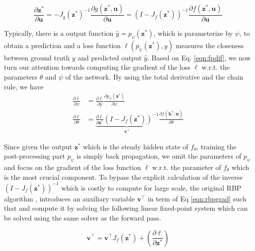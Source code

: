 \documentclass[twoside]{article}
\begin{document}
\begin{equation}
    \label{eqn:fpdif}
    \frac{\partial \mathbf{z}^{*}}{\partial \mathbf{u}} = - J_{g}(\mathbf{z}^*)^{-1} \frac{\partial g\left(\mathbf{z}^{*}, \mathbf{u}\right)}{\partial \mathbf{u}} =\left(I-J_{f}( \mathbf{z}^{*})\right)^{-1} \frac{\partial f\left(\mathbf{z}^{*}, \mathbf{u}\right)}{\partial \mathbf{u}}
\end{equation}

Typically, there is a output function $\hat{y}=p_\psi(\mathbf{z}^*)$, which is parameterize by $\psi$, to obtain a prediction and a loss function $\ell(p_\psi(\mathbf{z}^*), y)$ measures the closeness between ground truth $y$ and predicted output $\hat{y}$.
Based on Eq. \ref{eqn:fpdif}, we now turn our attention towards computing the gradient of the loss $\ell$ w.r.t. the parameters $\theta$ and $\psi$ of the network. By using the total derivative and the chain rule, we have
\begin{equation}
    \label{eqn:rbpgrad}
    \begin{aligned}
        \frac{\partial \ell}{\partial \psi} &=\frac{\partial \ell}{\partial \hat{y}} \frac{\partial p_\psi\left(\mathbf{z}^{*}\right)}{\partial \psi} \\
        \frac{\partial \ell}{\partial \theta} &=\underbrace{\frac{\partial \ell}{\partial \mathbf{z}^*}\left(I-J_{f}(\mathbf{z}^{*})\right)^{-1}}_{\mathbf{v}^{\top}} \frac{\partial f\left(\mathbf{h}^{*}; \mathbf{u}\right)}{\partial \theta}
    \end{aligned}
\end{equation}

Since given the output $\mathbf{z}^*$ which is the steady hidden state of $f_\theta$, training the post-processing part $p_\psi$ is simply back propagation, we omit the parameters of $p_\psi$ and focus on the gradient of the loss function $\ell$ w.r.t. the parameter of $f_\theta$ which is the most crucial component. 
To bypass the explicit calculation of the inverse $\left(I-J_{f }(\mathbf{z}^{*})\right)^{-1}$ which is costly to compute for large scale, the original RBP algorithm \cite{Pineda}, \cite{Almeida} introduces an auxiliary variable $\mathbf{v}^{\top}$ in term of Eq \ref{eqn:rbpgrad} such that and compute it by solving the following linear fixed-point system which can be solved using the same solver as the forward pass.

$$
\mathbf{v}^{\top}= \mathbf{v}^\top J_{f}(\mathbf{z}^{*}) + \left(\frac{\partial \ell}{\partial \mathbf{z}^*}\right)
$$
\end{document}
